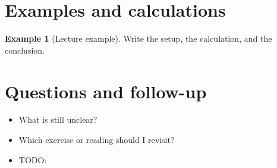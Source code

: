 \documentclass[11pt]{article}
\newcommand{\1}{\mathbf{1}}
\theoremstyle{notestyle}
\theoremstyle{definition}
\newtheorem{example}[theorem]{Example}
\begin{document}
\section{Examples and calculations}
\begin{example}[Lecture example]
Write the setup, the calculation, and the conclusion.
\end{example}

\section{Questions and follow-up}
\begin{itemize}
  \item What is still unclear?
  \item Which exercise or reading should I revisit?
  \item TODO: 
\end{itemize}
\end{document}
